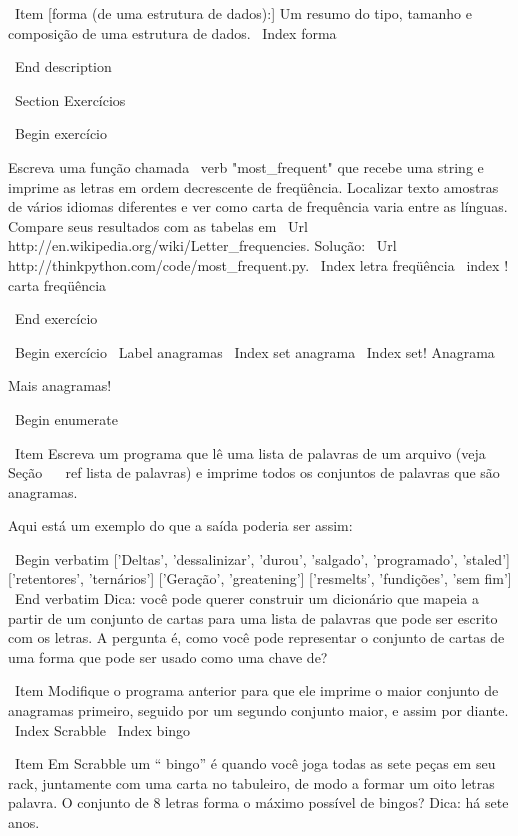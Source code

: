 \documentclass[10pt]{book}
\begin{document}
\begin {itemize}
{{{{{{{{{\ Item [forma (de uma estrutura de dados):] Um resumo do tipo,
tamanho e composição de uma estrutura de dados.
\ Index {} forma

\ End {description}


\ Section {Exercícios}

\ Begin {} exercício

Escreva uma função chamada \ verb "most_frequent" que recebe uma string e
imprime as letras em ordem decrescente de freqüência. Localizar texto
amostras de vários idiomas diferentes e ver como carta de frequência
varia entre as línguas. Compare seus resultados com as tabelas em
\ Url {http://en.wikipedia.org/wiki/Letter_frequencies}. Solução:
\ Url {http://thinkpython.com/code/most_frequent.py}. \ Index {letra
  freqüência} \ index {! carta freqüência}

\ End {} exercício


\ Begin {} exercício
\ Label {} anagramas
\ Index {set anagrama}
\ Index {set! Anagrama}

Mais anagramas!

\ Begin {enumerate}

\ Item Escreva um programa
que lê uma lista de palavras de um arquivo (veja Seção ~ \ ref {lista de palavras}) e
imprime todos os conjuntos de palavras que são anagramas.

Aqui está um exemplo do que a saída poderia ser assim:

\ Begin {verbatim}
['Deltas', 'dessalinizar', 'durou', 'salgado', 'programado', 'staled']
['retentores', 'ternários']
['Geração', 'greatening']
['resmelts', 'fundições', 'sem fim']
\ End {verbatim}
%
Dica: você pode querer construir um dicionário que mapeia a partir de um
conjunto de cartas para uma lista de palavras que pode ser escrito com os
letras. A pergunta é, como você pode representar o conjunto de
cartas de uma forma que pode ser usado como uma chave de?

\ Item Modifique o programa anterior para que ele imprime o maior conjunto
de anagramas primeiro, seguido por um segundo conjunto maior, e assim por diante.
\ Index {} Scrabble
\ Index {} bingo

\ Item Em Scrabble um `` bingo'' é quando você joga todas as sete peças em
seu rack, juntamente com uma carta no tabuleiro, de modo a formar um oito letras
palavra. O conjunto de 8 letras forma o máximo possível de bingos?
Dica: há sete anos.


}}}}}}}}}
\end{itemize}
\end{document}
